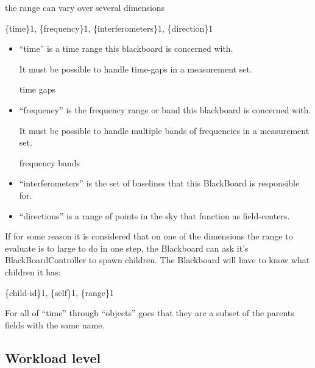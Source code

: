 \documentclass[]{lofar}
\begin{document}
      the range can vary over several dimensions

      \{time\}1, \{frequency\}1, \{interferometers\}1, \{direction\}1

      \begin{itemize}

	\item 

          ``time'' is a time range this blackboard is concerned with.
          \begin{requirement}
            It must be possible to handle time-gaps in a measurement set.
            \caption{time gaps\label{req:time-gaps}}
          \end{requirement}

	\item 

          ``frequency'' is the frequency range or band this blackboard
          is concerned with.

          \begin{requirement}
            It must be possible to handle multiple bands of frequencies in a
            measurement set.
            \caption{frequency bands\label{req:frequency-bands}}
          \end{requirement}

	\item 

          ``interferometers'' is the set of baselines that this
          BlackBoard is responsible for.

	\item 

          ``directions'' is a range of points in the sky that function
          as field-centers.

      \end{itemize}

      If for some reason it is considered that on one of the
      dimensions the range to evaluate is to large to do in one step,
      the Blackboard can ask it's BlackBoardController to spawn
      children. The Blackboard will have to know what children it has:

      \{child-id\}1, \{self\}1, \{range\}1

      For all of ``time'' through ``objects'' goes that they are a subset
      of the parents fields with the same name.

    \subsection{Workload level}
    \label{subsec:workload-level}\hypertarget{subsec:workload-level}{}%
\end{document}
